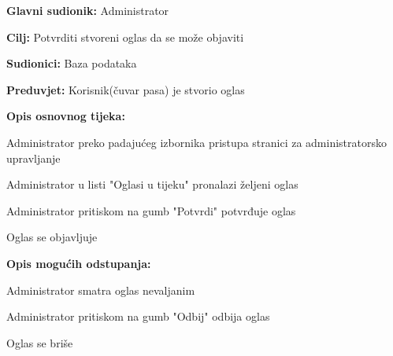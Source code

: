 					\noindent {}
					\begin{packed_item}
						
						\item \textbf{Glavni sudionik: } Administrator
						\item  \textbf{Cilj:} Potvrditi stvoreni oglas da se može objaviti
						\item  \textbf{Sudionici:} Baza podataka
						\item  \textbf{Preduvjet:} Korisnik(čuvar pasa) je stvorio oglas
						\item  \textbf{Opis osnovnog tijeka:}
						
						\item[] \begin{packed_enum}
							
							\item Administrator preko padajućeg izbornika pristupa stranici za administratorsko upravljanje
							\item Administrator u listi "Oglasi u tijeku" pronalazi željeni oglas
							\item Administrator pritiskom na gumb "Potvrdi" potvrđuje oglas
							\item Oglas se objavljuje
							
						\end{packed_enum}
						\item  \textbf{Opis mogućih odstupanja:}
						
						\item[] \begin{packed_item}
							
							\item[3.a] Administrator smatra oglas nevaljanim
							\item[] \begin{packed_enum}
								
								\item Administrator pritiskom na gumb "Odbij" odbija oglas
								\item Oglas se briše 
								
							\end{packed_enum}
							
						\end{packed_item}
					\end{packed_item}
					
